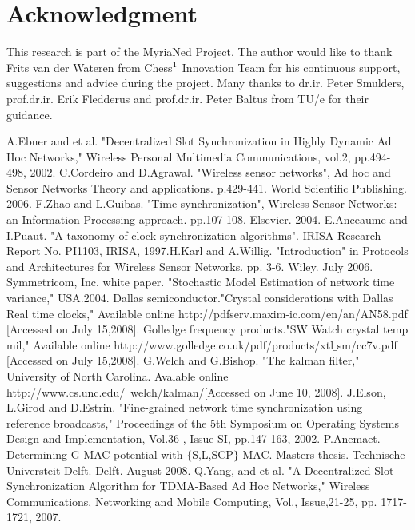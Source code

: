 \documentclass[journal]{IEEEtran}
\begin{document}
\section{\textbf{Acknowledgment}}This research is part of the MyriaNed Project. The author would like to thank Frits van der Wateren from Chess$\footnote{http:\slash \slash www.chess.nl}$ Innovation Team for his continuous support, suggestions and advice during the project. Many thanks to dr.ir. Peter Smulders, prof.dr.ir. Erik Fledderus and prof.dr.ir. Peter Baltus from TU\slash e for their guidance.
\begin{thebibliography}{\textbf{References}}
A.Ebner and et al. "Decentralized Slot Synchronization in Highly Dynamic Ad Hoc Networks," Wireless Personal Multimedia Communications, vol.2, pp.494-498, 2002.
C.Cordeiro and D.Agrawal. "Wireless sensor networks", Ad hoc and Sensor Networks Theory and applications. p.429-441. World Scientific Publishing. 2006.
F.Zhao and  L.Guibas. "Time synchronization", Wireless Sensor Networks: an Information Processing approach. pp.107-108. Elsevier. 2004.
E.Anceaume and I.Puaut. "A taxonomy of clock synchronization algorithms". IRISA Research Report No. PI1103, IRISA, 1997.H.Karl and A.Willig. "Introduction" in Protocols and Architectures for Wireless Sensor Networks. pp. 3-6. Wiley. July 2006.
Symmetricom, Inc. white paper. "Stochastic Model Estimation of network time variance," USA.2004.
Dallas semiconductor."Crystal considerations with Dallas Real time clocks," Available online http:\slash \slash pdfserv.maxim-ic.com\slash en\slash an\slash AN58.pdf [Accessed on July 15,2008].
Golledge frequency products."SW Watch crystal temp mil," Available online http:\slash \slash www.golledge.co.uk\slash pdf\slash products\slash xtl$\_$sm\slash cc7v.pdf [Accessed on July 15,2008].
G.Welch and G.Bishop. "The kalman filter," University of North Carolina. Avalable online http:\slash \slash www.cs.unc.edu\slash ~welch\slash kalman\slash  [Accessed on June 10, 2008].
J.Elson, L.Girod and D.Estrin. "Fine-grained network time synchronization using reference broadcasts," Proceedings of the 5th Symposium on Operating Systems Design and Implementation, Vol.36 , Issue SI, pp.147-163, 2002.
P.Anemaet. Determining G-MAC potential with $\{$S,L,SCP$\}$-MAC. Masters thesis. Technische Universteit Delft. Delft. August 2008.
Q.Yang, and et al. "A Decentralized Slot Synchronization Algorithm for TDMA-Based Ad Hoc Networks," Wireless Communications, Networking and Mobile Computing, Vol., Issue,21-25, pp. 1717-1721, 2007.

\end{thebibliography}
\end{document}
